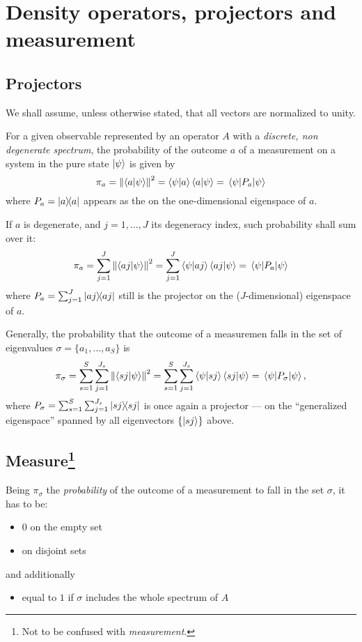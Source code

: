 \section{Density operators, projectors and measurement}

\subsection{Projectors}

We shall assume, unless otherwise stated, that all vectors are
normalized to unity.

For a given observable represented by an operator $A$ with a
\emph{discrete, non degenerate spectrum}, the probability of the
outcome $a$ of a
measurement on a system in the pure state $\ket{\psi}$ is given by
$$
\pi_{a} = \norm{\braket{a}{\psi}}^2 
        = \bra{\psi}\ket{a}\bra{a}\ket{\psi}
        = \mel{\psi}{P_{a}}{\psi}
$$
where $P_{a} = \ketbra{a}$ appears as the  on the
one-dimensional eigenspace of  $a$.

If $a$ is degenerate, and $j = 1, \dots, J$ its degeneracy index,
such probability shall sum over it:
$$
\pi_{a} = \sum_{j=1}^{J}\norm{\braket{aj}{\psi}}^2 
        = \sum_{j=1}^{J}\bra{\psi}\ket{aj}\bra{aj}\ket{\psi}
        = \mel{\psi}{P_{a}}{\psi}
$$
where $P_{a} = \sum_{j=1}^{J}\ketbra{aj}$
still is the projector on the
($J$-dimensional) eigenspace of $a$.

Generally, the probability that the outcome of a measuremen falls in
the set of eigenvalues $\sigma = \{a_{1}, \dots, a_{S}\}$ is
$$
\pi_{\sigma} = \sum_{s=1}^{S}\sum_{j=1}^{J_{s}}\norm{\braket{sj}{\psi}}^2 
        = \sum_{s=1}^{S}\sum_{j=1}^{J_{s}}\bra{\psi}\ket{sj}\bra{sj}\ket{\psi}
        = \mel{\psi}{P_{\sigma}}{\psi}
        ,
$$
where $P_{\sigma} = \sum_{s=1}^{S}\sum_{j=1}^{J_{s}}\ketbra{sj}$
is once again a projector --- on the ``generalized eigenspace'' spanned by all
eigenvectors $\{\ket{sj}\}$ above.

\subsection[Measure]{Measure\footnote{Not to be confused with \emph{measurement}.}}

Being $\pi_{\sigma}$ the \emph{probability} of the outcome of a measurement to
fall in the set $\sigma$, it has to be:
\begin{itemize}
\item $0$ on the empty set
\item {} on disjoint sets
\end{itemize}
and additionally
\begin{itemize}
\item equal to $1$ if $\sigma$ includes the whole spectrum of $A$
\end{itemize}
